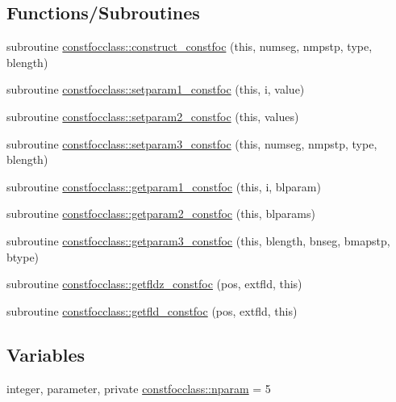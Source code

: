 \subsection*{Functions/\+Subroutines}
\begin{DoxyCompactItemize}
\item 
subroutine \mbox{\hyperlink{namespaceconstfocclass_a36197970c1524c85aeaea51d39f0ede7}{constfocclass\+::construct\+\_\+constfoc}} (this, numseg, nmpstp, type, blength)
\item 
subroutine \mbox{\hyperlink{namespaceconstfocclass_a14001bee7b5f9c4138d8042dcc94955c}{constfocclass\+::setparam1\+\_\+constfoc}} (this, i, value)
\item 
subroutine \mbox{\hyperlink{namespaceconstfocclass_a36ac221c9fb8e90f23b97b10cc272775}{constfocclass\+::setparam2\+\_\+constfoc}} (this, values)
\item 
subroutine \mbox{\hyperlink{namespaceconstfocclass_a9d02ddbf03689cdd653805ca5a56856e}{constfocclass\+::setparam3\+\_\+constfoc}} (this, numseg, nmpstp, type, blength)
\item 
subroutine \mbox{\hyperlink{namespaceconstfocclass_ab906b8830f5fb2cec09297d5004494e9}{constfocclass\+::getparam1\+\_\+constfoc}} (this, i, blparam)
\item 
subroutine \mbox{\hyperlink{namespaceconstfocclass_a59ea6cb7198ad0bf8446abe6978a9069}{constfocclass\+::getparam2\+\_\+constfoc}} (this, blparams)
\item 
subroutine \mbox{\hyperlink{namespaceconstfocclass_ae1fe9fc46cca742a797c388465086489}{constfocclass\+::getparam3\+\_\+constfoc}} (this, blength, bnseg, bmapstp, btype)
\item 
subroutine \mbox{\hyperlink{namespaceconstfocclass_a11f9a7cebf07bf044485eb4686f9357e}{constfocclass\+::getfldz\+\_\+constfoc}} (pos, extfld, this)
\item 
subroutine \mbox{\hyperlink{namespaceconstfocclass_a34425bf98b4a4cff016108f25a629dff}{constfocclass\+::getfld\+\_\+constfoc}} (pos, extfld, this)
\end{DoxyCompactItemize}
\subsection*{Variables}
\begin{DoxyCompactItemize}
\item 
integer, parameter, private \mbox{\hyperlink{namespaceconstfocclass_a4a04b85ebc26340b40e7c38cfad62bc1}{constfocclass\+::nparam}} = 5
\end{DoxyCompactItemize}


